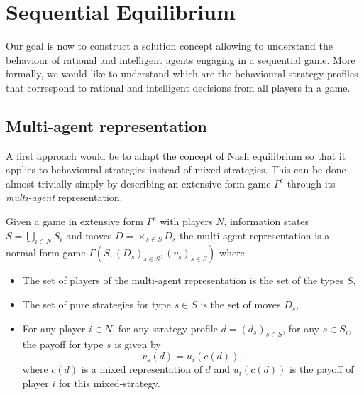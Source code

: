 \section{Sequential Equilibrium}
\label{ch4:sec:Eq}

Our goal is now to construct a solution concept allowing to understand the behaviour of rational and intelligent agents engaging in a sequential game. More formally, we would like to understand which are the behavioural strategy profiles that correspond to rational and intelligent decisions from all players in a game.

\subsection{Multi-agent representation}

A first approach would be to adapt the concept of Nash equilibrium so that it applies to behavioural strategies instead of mixed strategies. This can be done almost trivially simply by describing an extensive form game $\Gamma^e$ through its \emph{multi-agent} representation.
\begin{definition}
Given a game in extensive form $\Gamma^e$ with players $N$, information states $S = \bigcup_{i \in N} S_i$ and moves $D = \times_{s \in S} D_s$ the multi-agent representation is a normal-form game
$\Gamma(S,(D_s)_{s \in S}, (v_s)_{s \in S})$ where
\begin{itemize}
\item The set of players of the multi-agent representation is the set of the types $S$,
\item The set of pure strategies for type $s \in S$ is the set of moves $D_s$,
\item For any player $i \in N$, for  any strategy profile $d = (d_s)_{s \in S}$, for any $s \in S_i$,
the payoff for type $s$ is given by
$$ v_s(d) = u_i(c(d)),$$
where $c(d)$ is a mixed representation of $d$ and $u_i(c(d))$ is the payoff of player $i$ for this mixed-strategy.
\end{itemize}
\end{definition}
